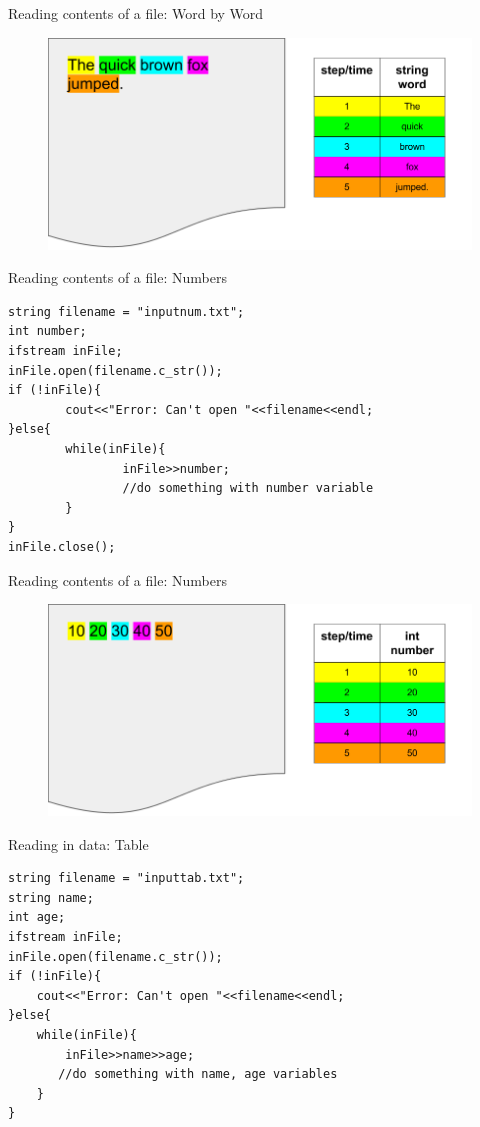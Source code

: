 \documentclass[xcolor={dvipsnames}]{beamer}
\begin{document}
\begin{frame}{Reading contents of a file: Word by Word}
	\begin{figure}
		\includegraphics[width=1\textwidth]{readword}
	\end{figure}
\end{frame}


\begin{frame}[fragile]{Reading contents of a file: Numbers}
\begin{verbatim}
string filename = "inputnum.txt";
int number;
ifstream inFile;
inFile.open(filename.c_str());
if (!inFile){
        cout<<"Error: Can't open "<<filename<<endl;
}else{
        while(inFile){
                inFile>>number;
                //do something with number variable
        }
}
inFile.close();
\end{verbatim}
\end{frame}

\begin{frame}{Reading contents of a file: Numbers}
	\begin{figure}
		\includegraphics[width=1\textwidth]{readnumber}
	\end{figure}
\end{frame}

\begin{frame}[fragile]{Reading in data: Table}
\begin{verbatim}
string filename = "inputtab.txt";
string name;
int age;
ifstream inFile;
inFile.open(filename.c_str());
if (!inFile){
    cout<<"Error: Can't open "<<filename<<endl;
}else{
    while(inFile){
        inFile>>name>>age;
       //do something with name, age variables
    }
}
\end{verbatim}
\end{frame}
\end{document}

